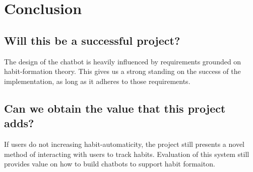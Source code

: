 
\newpage
\section{Conclusion}

\subsection*{Will this be a successful project?}
The design of the chatbot is heavily influenced by requirements grounded on habit-formation theory.
This gives us a strong standing on the success of the implementation, as long as it adheres to those requirements.

\subsection*{Can we obtain the value that this project adds?}
If users do not increasing habit-automaticity, the project still presents a novel method of interacting with users to track habits.
Evaluation of this system still provides value on how to build chatbots to support habit formaiton.